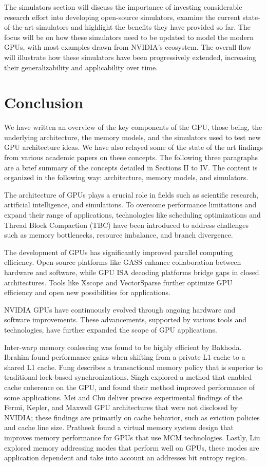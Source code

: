 \documentclass[conference]{IEEEtran}
\begin{document}
The simulators section will discuss the importance of investing considerable research effort into developing open-source simulators, examine the current state-of-the-art simulators and highlight the benefits they have provided so far.
The focus will be on how these simulators need to be updated to model the modern GPUs, with most examples drawn from NVIDIA's ecosystem.
The overall flow will illustrate how these simulators have been progressively extended, increasing their generalizability and applicability over time.




\section{Conclusion}
We have written an overview of the key components of the GPU, those being, the underlying architecture, the memory models, and the simulators used to test new GPU architecture ideas.
We have also relayed some of the state of the art findings from various academic papers on these concepts.
The following three paragraphs are a brief summary of the concepts detailed in Sections II to IV. The content is organized in the following way: architecture, memory models, and simulators.

The architecture of GPUs plays a crucial role in fields such as scientific research, artificial intelligence, and simulations. To overcome performance limitations and expand their range of applications, technologies like scheduling optimizations and Thread Block Compaction (TBC) have been introduced to address challenges such as memory bottlenecks, resource imbalance, and branch divergence.

The development of GPUs has significantly improved parallel computing efficiency. Open-source platforms like GASS enhance collaboration between hardware and software, while GPU ISA decoding platforms bridge gaps in closed architectures. Tools like Xscope and VectorSparse further optimize GPU efficiency and open new possibilities for applications.

NVIDIA GPUs have continuously evolved through ongoing hardware and software improvements. These advancements, supported by various tools and technologies, have further expanded the scope of GPU applications.

Inter-warp memory coalescing was found to be highly efficient by Bakhoda.
Ibrahim found performance gains when shifting from a private L1 cache to a shared L1 cache.
Fung describes a transactional memory policy that is superior to traditional lock-based synchronizations.
Singh explored a method that enabled cache coherence on the GPU, and found their method improved performance of some applications.
Mei and Chu deliver precise experimental findings of the Fermi, Kepler, and Maxwell GPU architectures that were not disclosed by NVIDIA; these findings are primarily on cache behavior, such as eviction policies and cache line size.
Pratheek found a virtual memory system design that improves memory performance for GPUs that use MCM technologies.
Lastly, Liu explored memory addressing modes that perform well on GPUs, these modes are application dependent and take into account an addresses bit entropy region.
\end{document}
